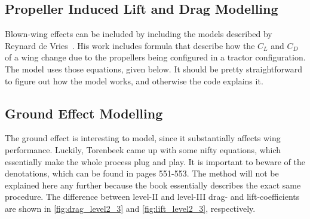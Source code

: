 \subsection{Propeller Induced Lift and Drag Modelling}
Blown-wing effects can be included by including the models described by Reynard de Vries~\cite{de2019preliminary}. His work includes formula that describe how the $C_L$ and $C_D$ of a wing change due to the propellers being configured in a tractor configuration. The model uses those equations, given below. It should be pretty straightforward to figure out how the model works, and otherwise the code explains it.

\subsection{Ground Effect Modelling}
The ground effect is interesting to model, since it substantially affects wing performance. Luckily, Torenbeek came up with some nifty equations, which essentially make the whole process plug and play. It is important to beware of the denotations, which can be found in pages 551-553. The method will not be explained here any further because the book essentially describes the exact same procedure. The difference between level-II and level-III drag- and lift-coefficients are shown in \autoref{fig:drag_level2_3} and \autoref{fig:lift_level2_3}, respectively.


